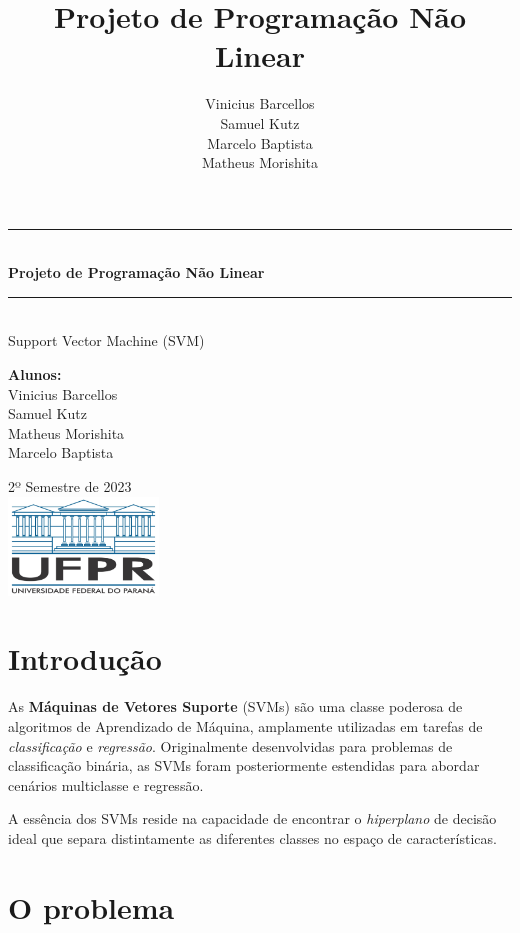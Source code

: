 \documentclass{article}
\title{Projeto de Programação Não Linear}
\author{Vinicius Barcellos\\Samuel Kutz \\Marcelo Baptista \\Matheus Morishita}
\date{}
\begin{document}
\newcommand{\HRule}{\rule{\linewidth}{0.5mm}}
\begin{titlepage}
    \begin{center}
        \vspace*{0.5cm}
            
        \Huge
        \HRule\\[0.4cm]
        \textbf{Projeto de Programação Não Linear}
        \HRule\\[0.4cm]

        
        \vspace{0.5cm}
        \LARGE
        Support Vector Machine (SVM)
            
        \vspace{0.8cm}
        \textbf{Alunos:}\\
        Vinicius Barcellos\\Samuel Kutz\\Matheus Morishita\\Marcelo Baptista
            
        \vfill
        2º Semestre de 2023\\ 
        \vfill
        \includegraphics[width=0.3\textwidth]{ufpr_1000.jpg}
            
            
    \end{center}
\end{titlepage}

\section{Introdução}

As \textbf{Máquinas de Vetores Suporte} (SVMs) são uma classe poderosa de algoritmos de Aprendizado de Máquina, amplamente utilizadas em tarefas de \textit{classificação} e \textit{regressão}. Originalmente desenvolvidas para problemas de classificação binária, as SVMs foram posteriormente estendidas para abordar cenários multiclasse e regressão.

A essência dos SVMs reside na capacidade de encontrar o \textit{hiperplano} de decisão ideal que separa distintamente as diferentes classes no espaço de características.

\section{O problema}
\end{document}
